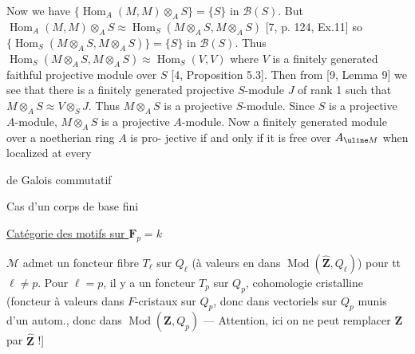 Now we have $\{\operatorname{Hom}_A(M,M)\otimes_A S\}=\{S\}$ in $\mathcal B(S)$. But
$\operatorname{Hom}_A(M,M)\otimes_A S\approx\operatorname{Hom}_S(M\otimes_A S,M\otimes_A S)$ [7, p. 124, Ex.11] so
$\{\operatorname{Hom}_S(M\otimes_A S,M\otimes_A S)\}=\{S\}$ in $\mathcal B(S)$. Thus
$\operatorname{Hom}_S(M\otimes_A S,M\otimes_A S)\approx\operatorname{Hom}_S(V,V)$
where $V$ is a finitely generated faithful projective
module over $S$ [4, Proposition 5.3]. Then from [9, Lemma 9] we
see that there is a finitely generated projective $S$-module $J$ of rank 1
such that $M\otimes_A S\approx V\otimes_S J$. Thus $M\otimes_A S$ is a projective $S$-module.
Since $S$ is a projective $A$-module, $M\otimes_A S$ is a projective $A$-module.
Now a finitely generated module over a noetherian ring $A$ is pro-
jective if and only if it is free over $A_{\uline M}$ when localized at every

 de Galois 
commutatif

Cas d'un corps de
base fini

\uline{Catégorie des motifs sur $\mathbf F_p=k$}

$\mathcal M$ admet un foncteur fibre $T_\ell$ sur $Q_\ell$ (à valeurs en dans $\operatorname{Mod}(\widehat{\mathbf Z},Q_\ell)$) pour tt $\ell\ne p$.
Pour $\ell=p$, il y a un foncteur $T_p$ sur $Q_p$, cohomologie cristalline (foncteur à valeurs dans $F$-cristaux sur $Q_p$, donc dans vectoriels sur $Q_p$ munis d'un autom., donc dans $\operatorname{Mod}(\mathbf Z,Q_p)$ --- Attention, ici on ne peut remplacer $\mathbf Z$ par $\widehat{\mathbf Z}$ !]

